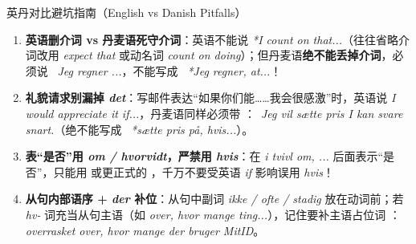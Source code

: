 \begin{grammatikbox}{英丹对比避坑指南（English vs Danish Pitfalls）}
\begin{enumerate}
  \item \textbf{英语删介词 vs 丹麦语死守介词}：英语不能说 \textit{*I count on that...}（往往省略介词改用 \textit{expect that} 或动名词 \textit{count on doing}）；但丹麦语\textbf{绝不能丢掉介词}，必须说 \ \textit{Jeg regner ...}，不能写成 \ \textit{*Jeg regner, at...}！
  \item \textbf{礼貌请求别漏掉 \textit{det}}：写邮件表达“如果你们能……我会很感激”时，英语说 \textit{I would appreciate it if...}，丹麦语同样必须带 ：\ \textit{Jeg vil sætte pris  I kan svare snart.}（绝不能写成 \ \textit{*sætte pris på, hvis...}）。
  \item \textbf{表“是否”用 \textit{om / hvorvidt}，严禁用 \textit{hvis}}：在 \textit{i tvivl om, ...} 后面表示“是否”，只能用  或更正式的 ，千万不要受英语 \textit{if} 影响误用 \textit{hvis}！
  \item \textbf{从句内部语序 + \textit{der} 补位}：从句中副词 \textit{ikke / ofte / stadig} 放在动词前；若 \textit{hv-} 词充当从句主语（如 \textit{over, hvor mange ting...}），记住要补主语占位词 ：\textit{overrasket over, hvor mange der bruger MitID}。
\end{enumerate}
\end{grammatikbox}


